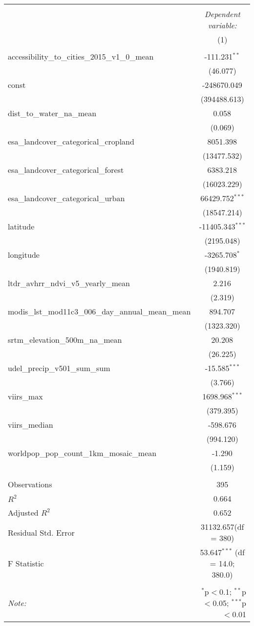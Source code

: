 \begin{table}[!htbp] \centering
\begin{tabular}{@{\extracolsep{5pt}}lc}
\\[-1.8ex]\hline
\hline \\[-1.8ex]
& \multicolumn{1}{c}{\textit{Dependent variable:}} \
\cr \cline{1-2}
\\[-1.8ex] & (1) \\
\hline \\[-1.8ex]
 accessibility_to_cities_2015_v1_0_mean & -111.231$^{**}$ \\
  & (46.077) \\
 const & -248670.049$^{}$ \\
  & (394488.613) \\
 dist_to_water_na_mean & 0.058$^{}$ \\
  & (0.069) \\
 esa_landcover_categorical_cropland & 8051.398$^{}$ \\
  & (13477.532) \\
 esa_landcover_categorical_forest & 6383.218$^{}$ \\
  & (16023.229) \\
 esa_landcover_categorical_urban & 66429.752$^{***}$ \\
  & (18547.214) \\
 latitude & -11405.343$^{***}$ \\
  & (2195.048) \\
 longitude & -3265.708$^{*}$ \\
  & (1940.819) \\
 ltdr_avhrr_ndvi_v5_yearly_mean & 2.216$^{}$ \\
  & (2.319) \\
 modis_lst_mod11c3_006_day_annual_mean_mean & 894.707$^{}$ \\
  & (1323.320) \\
 srtm_elevation_500m_na_mean & 20.208$^{}$ \\
  & (26.225) \\
 udel_precip_v501_sum_sum & -15.585$^{***}$ \\
  & (3.766) \\
 viirs_max & 1698.968$^{***}$ \\
  & (379.395) \\
 viirs_median & -598.676$^{}$ \\
  & (994.120) \\
 worldpop_pop_count_1km_mosaic_mean & -1.290$^{}$ \\
  & (1.159) \\
\hline \\[-1.8ex]
 Observations & 395 \\
 $R^2$ & 0.664 \\
 Adjusted $R^2$ & 0.652 \\
 Residual Std. Error & 31132.657(df = 380)  \\
 F Statistic & 53.647$^{***}$ (df = 14.0; 380.0) \\
\hline
\hline \\[-1.8ex]
\textit{Note:} & \multicolumn{1}{r}{$^{*}$p$<$0.1; $^{**}$p$<$0.05; $^{***}$p$<$0.01} \\
\end{tabular}
\end{table}